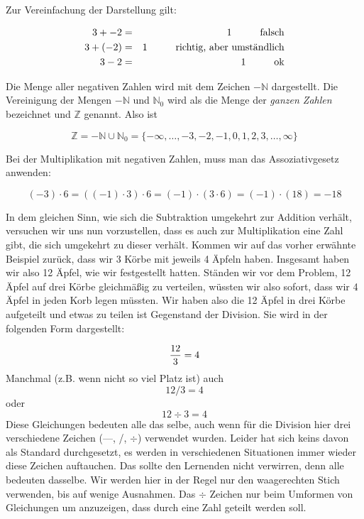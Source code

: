 Zur Vereinfachung der Darstellung gilt:

\begin{eqnarray*}
3 + -2 &=& 1 \hspace{1cm}\textnormal{falsch}\\
3 + (-2) &=& 1 \hspace{1cm}\textnormal{richtig, aber umständlich}\\
3 - 2  &=& 1 \hspace{1cm}\textnormal{ok}
\end{eqnarray*}

Die Menge aller negativen Zahlen wird mit dem Zeichen $-\mathbb{N} $ dargestellt. Die Vereinigung der Mengen $-\mathbb{N} $ und $\mathbb{N}_0$ wird als die Menge der \textsl{ganzen Zahlen} bezeichnet und $\mathbb{Z}$ genannt. Also ist 

\[
\mathbb{Z} = -\mathbb{N} \cup \mathbb{N}_0 =  \{ -\infty, \dots, -3, -2, -1, 0, 1, 2, 3, \dots, \infty \}
\]

Bei der Multiplikation mit negativen Zahlen, muss man das Assoziativgesetz anwenden:

\[ (-3)\cdot 6 = ((-1)\cdot 3) \cdot 6 = (-1)\cdot (3\cdot 6) = (-1)\cdot (18) = -18 \]

In dem gleichen Sinn, wie sich die Subtraktion umgekehrt zur Addition verhält, versuchen wir uns nun vorzustellen, dass es auch zur Multiplikation eine Zahl gibt, die sich umgekehrt zu dieser verhält. Kommen wir auf das vorher erwähnte Beispiel zurück, dass wir 3 Körbe mit jeweils 4 Äpfeln haben. Insgesamt haben wir also 12 Äpfel, wie wir festgestellt hatten. Ständen wir vor dem Problem, 12 Äpfel auf drei Körbe gleichmäßig zu verteilen, wüssten wir also sofort, dass wir 4 Äpfel in jeden Korb legen müssten. Wir haben also die 12 Äpfel in drei Körbe aufgeteilt und etwas zu teilen ist Gegenstand der Division. Sie wird in der folgenden Form dargestellt:

\[ {12\over 3} = 4 \] 
Manchmal (z.B. wenn nicht so viel Platz ist) auch
\[ 12 / 3 = 4 \]
oder
\[ 12 \div 3 = 4 \]
Diese Gleichungen bedeuten alle das selbe, auch wenn für die Division hier drei verschiedene Zeichen (---, /, $\div$) verwendet wurden. Leider hat sich keins davon als Standard durchgesetzt, es werden in verschiedenen Situationen immer wieder diese Zeichen auftauchen. Das sollte den Lernenden nicht verwirren, denn alle bedeuten dasselbe. Wir werden hier in der Regel nur den waagerechten Stich verwenden, bis auf wenige Ausnahmen. Das $\div$ Zeichen nur beim Umformen von Gleichungen um anzuzeigen, dass durch eine Zahl geteilt werden soll.

